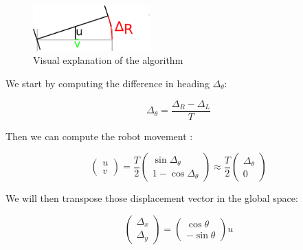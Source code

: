 \documentclass[a4paper]{IEEEtran}
\begin{document}
\begin{figure}[h]
    \begin{center}
        \includegraphics[width=0.4\textwidth]{algorithm.png}
        \caption{Visual explanation of the algorithm}
    \end{center}
\end{figure}

We start by computing the difference in heading $\Delta_\theta$:

\begin{equation}
    \Delta_\theta = \frac{\Delta_R - \Delta_L}{T}
\end{equation}

Then we can compute the robot movement :

\begin{equation}
    \begin{pmatrix}
        u\\v
    \end{pmatrix}  
    =
    \frac{T}{2}
    \begin{pmatrix}
        \sin \Delta_\theta\\1 - \cos \Delta_\theta
    \end{pmatrix}
    \approx
    \frac{T}{2}
    \begin{pmatrix}
        \Delta_\theta\\ 0
    \end{pmatrix}
\end{equation}

We will then transpose those displacement vector in the global space:

\begin{equation}
    \begin{pmatrix}
        \Delta_x\\\Delta_y
    \end{pmatrix}
    =
    \begin{pmatrix}
        \cos\theta \\-\sin\theta
    \end{pmatrix}
    u 
\end{equation}
\end{document}
